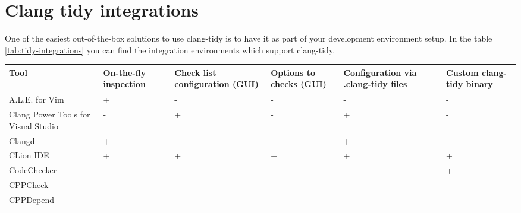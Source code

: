 \section{Clang tidy integrations}

One of the easiest out-of-the-box solutions to use clang-tidy is to have it as part of your development environment setup. In the table \ref{tab:tidy-integrations} you can find the integration environments which support clang-tidy.

\begin{table}[H]
    \centering
    \begin{tabular}{|m{2.5cm}| >{\centering\arraybackslash} m{2cm}|>{\centering\arraybackslash} m{2cm}|>{\centering\arraybackslash} m{2cm}|>{\centering\arraybackslash} m{2cm}|>{\centering\arraybackslash} m{2cm}|}
         \hline \scriptsize{\textbf{Tool}} & 
         \textbf{\scriptsize{On-the-fly inspection}} & 
         \textbf{\scriptsize{Check list configuration (GUI)}} & 
         \textbf{\scriptsize{Options to checks (GUI)}} &
         \textbf{ \scriptsize{Configuration via .clang-tidy files}} &
         \textbf{ \scriptsize{Custom clang-tidy binary}} \\

         \hline  \scriptsize{A.L.E. for Vim} & \scriptsize{+} & \scriptsize{-} &  \scriptsize{-} &  \scriptsize{-} &  \scriptsize{-}  \\

         \hline  \scriptsize{Clang Power Tools for Visual Studio} & \scriptsize{-} & \scriptsize{+} &  \scriptsize{-} &  \scriptsize{+} &  \scriptsize{-}  \\

         \hline  \scriptsize{Clangd} & \scriptsize{+} & \scriptsize{-} &  \scriptsize{-} &  \scriptsize{+} &  \scriptsize{-}  \\

         \hline  \scriptsize{CLion IDE} & \scriptsize{+} & \scriptsize{+} &  \scriptsize{+} &  \scriptsize{+} &  \scriptsize{+}  \\

         \hline  \scriptsize{CodeChecker} & \scriptsize{-} & \scriptsize{-} &  \scriptsize{-} &  \scriptsize{-} &  \scriptsize{+}  \\

         \hline  \scriptsize{CPPCheck} & \scriptsize{-} & \scriptsize{-} &  \scriptsize{-} &  \scriptsize{-} &  \scriptsize{-}  \\

         \hline  \scriptsize{CPPDepend} & \scriptsize{-} & \scriptsize{-} &  \scriptsize{-} &  \scriptsize{-} &  \scriptsize{-}  \\


\end{tabular}
\end{table}
